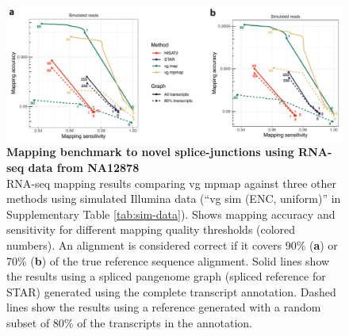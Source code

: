 \documentclass[11pt]{ucthesis}
\begin{document}
\begin{figure}[H]
\begin{center}
\includegraphics[width=\textwidth]{mpmapfigures/figureS1.pdf}
\caption{\textbf{Mapping benchmark to novel splice-junctions using RNA-seq data from NA12878} \\
RNA-seq mapping results comparing vg mpmap against three other methods using simulated Illumina data (``vg sim (ENC, uniform)'' in Supplementary Table \ref{tab:sim-data}). Shows mapping accuracy and sensitivity for different mapping quality thresholds (colored numbers). An alignment is considered correct if it covers 90\% (\textbf{a}) or 70\% (\textbf{b}) of the true reference sequence alignment. Solid lines show the results using a spliced pangenome graph (spliced reference for STAR) generated using the complete transcript annotation. Dashed lines show the results using a reference generated with a random subset of 80\% of the transcripts in the annotation.
} \label{fig:splice-junction-mapping}
\end{center}
\end{figure}
\end{document}

